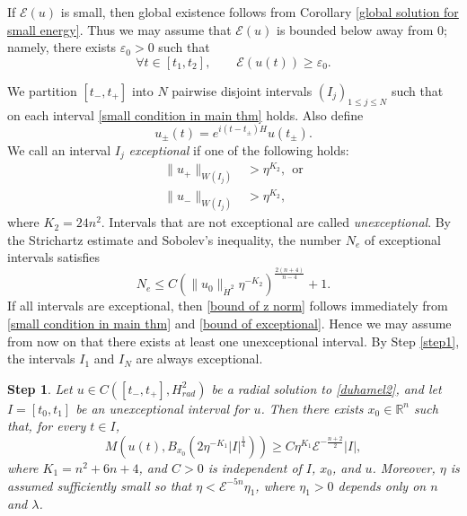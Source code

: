 \documentclass[11pt,a4paper]{article}
\numberwithin{equation}{section}
\newtheorem{step}{Step}[section]
\begin{document}
If $\mathcal{E}(u)$ is small, then global existence follows from Corollary \ref{global solution for small energy}. Thus we may assume that $\mathcal{E}(u)$ is bounded below away from $0$; namely, there exists $\varepsilon_{0}>0$ such that
\[
\forall t \in [t_{1}, t_{2}],\qquad \mathcal{E}(u(t)) \geq \varepsilon_{0}.
\]

We partition $[t_{-}, t_{+}]$ into $N$ pairwise disjoint intervals $(I_{j})_{1\leq j \leq N}$ such that on each interval \eqref{small condition in main thm} holds.
Also define
\[
u_{\pm}(t) = e^{i(t - t_{\pm})H}u(t_{\pm}).
\]
We call an interval $I_{j}$ \emph{exceptional} if one of the following holds:
\begin{equation}\label{exceptional}
\begin{aligned}
\|u_{+}\|_{W(I_{j})} &> \eta^{K_{2}},\ \ \text{or} \\
\|u_{-}\|_{W(I_{j})} &> \eta^{K_{2}},
\end{aligned}
\end{equation}
where $K_{2} = 24n^{2}$.
Intervals that are not exceptional are called \emph{unexceptional}.
By the Strichartz estimate and Sobolev's inequality, the number $N_{e}$ of exceptional intervals satisfies
\begin{equation}\label{bound of exceptional}
N_{e} \leq C(\|u_{0}\|_{\dot{H}^{2}}\eta^{-K_{2}})^{\frac{2(n+4)}{n-4}} + 1.
\end{equation}
If all intervals are exceptional, then \eqref{bound of z norm} follows immediately from \eqref{small condition in main thm} and \eqref{bound of exceptional}.
Hence we may assume from now on that there exists at least one unexceptional interval.
By Step \ref{step1}, the intervals $I_{1}$ and $I_{N}$ are always exceptional.

\begin{step}\label{step2}
Let $u \in C([t_{-}, t_{+}], H^{2}_{rad})$ be a radial solution to \eqref{duhamel2}, and let $I = [t_{0}, t_{1}]$ be an unexceptional interval for $u$.
Then there exists $x_{0} \in \mathbb{R}^{n}$ such that, for every $t \in I$,
\begin{equation}\label{conclusion of step9-2}
M\left(u(t), B_{x_{0}}(2\eta^{-K_{1}}|I|^{\frac{1}{4}}) \right) \geq C\eta^{K_{1}}\mathcal{E}^{-\frac{n+2}{2}}|I|,
\end{equation}
where $K_{1} = n^{2} + 6n + 4$, and $C>0$ is independent of $I$, $x_{0}$, and $u$.
Moreover, $\eta$ is assumed sufficiently small so that $\eta < \mathcal{E}^{-5n}\eta_{1}$, where $\eta_{1} > 0$ depends only on $n$ and $\lambda$.
\end{step}
\end{document}
